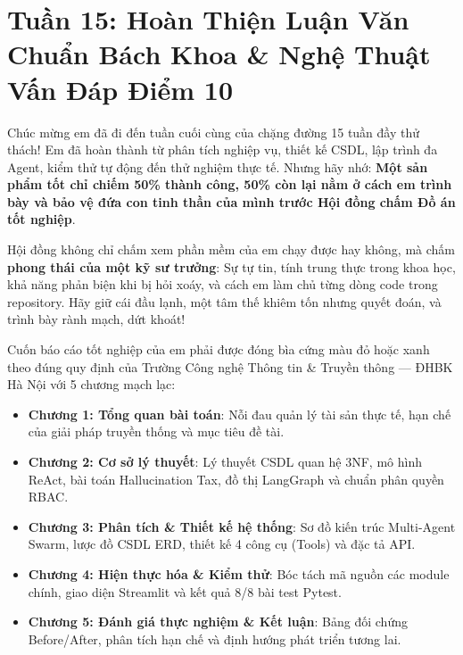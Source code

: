 ﻿\section{Tuần 15: Hoàn Thiện Luận Văn Chuẩn Bách Khoa \& Nghệ Thuật Vấn Đáp Điểm 10}
\label{sec:tuan_15}

\begin{advisorbox}
Chúc mừng em đã đi đến tuần cuối cùng của chặng đường 15 tuần đầy thử thách! Em đã hoàn thành từ phân tích nghiệp vụ, thiết kế CSDL, lập trình đa Agent, kiểm thử tự động đến thử nghiệm thực tế. Nhưng hãy nhớ: \textbf{Một sản phẩm tốt chỉ chiếm 50\% thành công, 50\% còn lại nằm ở cách em trình bày và bảo vệ đứa con tinh thần của mình trước Hội đồng chấm Đồ án tốt nghiệp}.

Hội đồng không chỉ chấm xem phần mềm của em chạy được hay không, mà chấm \textbf{phong thái của một kỹ sư trưởng}: Sự tự tin, tính trung thực trong khoa học, khả năng phản biện khi bị hỏi xoáy, và cách em làm chủ từng dòng code trong repository. Hãy giữ cái đầu lạnh, một tâm thế khiêm tốn nhưng quyết đoán, và trình bày rành mạch, dứt khoát!
\end{advisorbox}

\begin{literaturebox}
Cuốn báo cáo tốt nghiệp của em phải được đóng bìa cứng màu đỏ hoặc xanh theo đúng quy định của Trường Công nghệ Thông tin \& Truyền thông — ĐHBK Hà Nội với 5 chương mạch lạc:
\begin{itemize}[leftmargin=1.5em]
    \item \textbf{Chương 1: Tổng quan bài toán}: Nỗi đau quản lý tài sản thực tế, hạn chế của giải pháp truyền thống và mục tiêu đề tài.
    \item \textbf{Chương 2: Cơ sở lý thuyết}: Lý thuyết CSDL quan hệ 3NF, mô hình ReAct, bài toán Hallucination Tax, đồ thị LangGraph và chuẩn phân quyền RBAC.
    \item \textbf{Chương 3: Phân tích \& Thiết kế hệ thống}: Sơ đồ kiến trúc Multi-Agent Swarm, lược đồ CSDL ERD, thiết kế 4 công cụ (Tools) và đặc tả API.
    \item \textbf{Chương 4: Hiện thực hóa \& Kiểm thử}: Bóc tách mã nguồn các module chính, giao diện Streamlit và kết quả 8/8 bài test Pytest.
    \item \textbf{Chương 5: Đánh giá thực nghiệm \& Kết luận}: Bảng đối chứng Before/After, phân tích hạn chế và định hướng phát triển tương lai.
\end{itemize}
\end{literaturebox}

